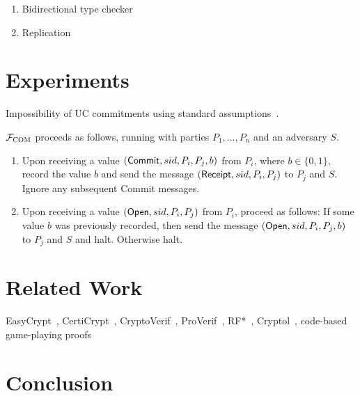 \documentclass[acmsmall,review,anonymous]{acmart}\settopmatter{printfolios=true,printccs=false,printacmref=false}
\begin{document}
\begin{enumerate}
\item Bidirectional type checker
\item Replication
\end{enumerate}

\section{Experiments}\label{sec:experiments}

Impossibility of UC commitments using standard assumptions~\cite{canetti2001commitments}.

\begin{func}[COM]
    $\mathcal{F}_{\textsc{COM}}$ proceeds as follows, running with parties $P_1, \ldots, P_n$ and an adversary $S$.
    \begin{enumerate}
        \item Upon receiving a value $({\sf Commit}, sid, P_i, P_j, b)$ from
          $P_i$, where $b \in \{ 0, 1 \}$, record the value $b$ and send the
          message $({\sf Receipt}, sid, P_i, P_j)$ to $P_j$ and $S$. Ignore any
          subsequent {\sf Commit} messages.

        \item Upon receiving a value $({\sf Open}, sid, P_i, P_j)$ from $P_i$,
          proceed as follows: If some value $b$ was previously recorded, then
          send the message $({\sf Open}, sid, P_i, P_j, b)$ to $P_j$ and $S$ and halt. Otherwise halt.
    \end{enumerate}
\end{func}



\section{Related Work}
EasyCrypt~\cite{barthe2011computer}, CertiCrypt~\cite{barthe2009formal},
CryptoVerif~\cite{blanchet2007cryptoverif},
ProVerif~\cite{blanchet2005proverif}, RF*~\cite{barthe2014probabilistic},
Cryptol~\cite{lewis2003cryptol}, code-based game-playing
proofs~\cite{bellare2006security}
\section{Conclusion}
\end{document}
